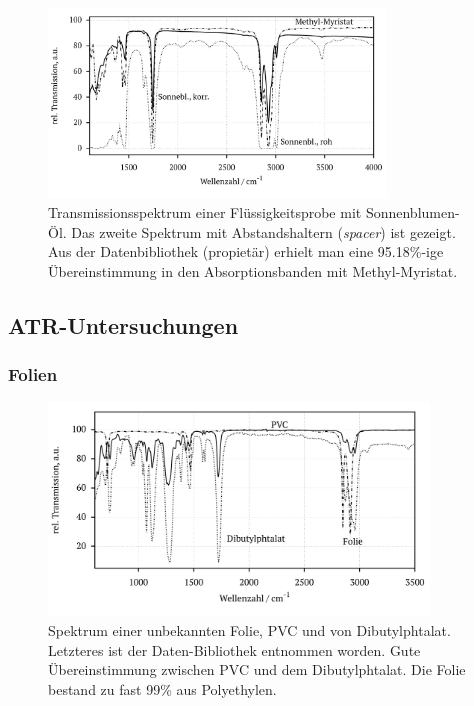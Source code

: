 \documentclass[a4paper,10pt,twocolumn]{article}
\newcommand{\tilt}[1]{\textit{#1}}
\begin{document}
			\begin{figure}
				\centering
				\includegraphics[width=0.8\textwidth]{Gruppe2A/sonnen.pdf}
				\caption{Transmissionsspektrum einer Fl\"ussigkeitsprobe mit Sonnenblumen-\"Ol. Das zweite Spektrum mit Abstandshaltern (\tilt{spacer}) ist gezeigt. Aus der Datenbibliothek (propiet\"ar) erhielt man eine 95.18\%-ige \"Ubereinstimmung in den Absorptionsbanden mit Methyl-Myristat.} 
				\label{img:sonnen}
			\end{figure}

	\newpage

		\subsection{ATR-Untersuchungen}

		\subsubsection{Folien}

			\begin{figure}
			\centering
				\includegraphics[width=0.9\textwidth]{Gruppe2A/folien.pdf}
				\caption{Spektrum einer unbekannten Folie, PVC und von Dibutylphtalat. Letzteres ist der Daten-Bibliothek entnommen worden. Gute \"Ubereinstimmung zwischen PVC und dem Dibutylphtalat. Die Folie bestand zu fast 99\% aus Polyethylen.} 
				\label{img:folien}
			\end{figure}
			
\end{document}
